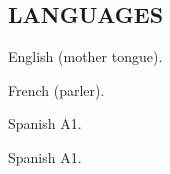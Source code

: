 \documentclass[11pt]{article}
\begin{document}

\subsection{LANGUAGES}
    {English (mother tongue).}
    
    {French (parler).}
    
    {Spanish A1.}
    


    Spanish A1.
\end{document}
